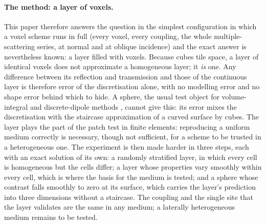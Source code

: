 \documentclass[11pt,a4paper]{article}
\begin{document}
\paragraph{The method: a layer of voxels.} This paper therefore answers the question in the simplest
configuration in which a voxel scheme runs in full (every voxel, every coupling, the whole
multiple-scattering series, at normal and at oblique incidence) and the exact answer is nevertheless
known: a layer filled with voxels. Because cubes tile space, a layer of identical voxels does not
approximate a homogeneous layer; it \emph{is} one. Any difference between its reflection and
transmission and those of the continuous layer is therefore error of the discretisation alone, with no
modelling error and no shape error behind which to hide. A sphere, the usual test object for
volume-integral and discrete-dipole methods \citep{Yurkin2006}, cannot give this: its error mixes the
discretisation with the staircase approximation of a curved surface by cubes. The layer plays the part
of the patch test in finite elements: reproducing a uniform medium correctly is necessary, though not
sufficient, for a scheme to be trusted in a heterogeneous one. The experiment is then made harder in
three steps, each with an exact solution of its own: a randomly stratified layer, in which every cell
is homogeneous but the cells differ; a layer whose properties vary smoothly within every cell, which is
where the basis for the medium is tested; and a sphere whose contrast falls smoothly to zero at its
surface, which carries the layer's prediction into three dimensions without a staircase. The coupling
and the single site that the layer validates are the same in any medium; a laterally heterogeneous
medium remains to be tested.
\end{document}
